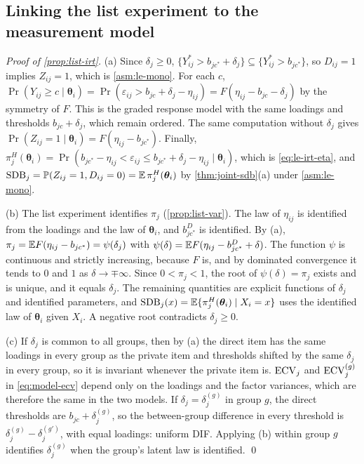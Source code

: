 \subsection{Linking the list experiment to the measurement model}\label{app:pd-irt}

\emph{Proof of \cref{prop:list-irt}.} (a) Since $\delta_j\ge0$, $\{Y^*_{ij}>b_{jc^*}+\delta_j\}\subseteq\{Y^*_{ij}>b_{jc^*}\}$, so $D_{ij}=1$ implies $Z_{ij}=1$, which is \cref{asm:le-mono}. For each $c$, $\Pr(Y_{ij}\ge c\mid\bm\theta_i)=\Pr(\varepsilon_{ij}>b_{jc}+\delta_j-\eta_{ij})=F(\eta_{ij}-b_{jc}-\delta_j)$ by the symmetry of $F$. This is the graded response model with the same loadings and thresholds $b_{jc}+\delta_j$, which remain ordered. The same computation without $\delta_j$ gives $\Pr(Z_{ij}=1\mid\bm\theta_i)=F(\eta_{ij}-b_{jc^*})$. Finally, $\pi^H_j(\bm\theta_i)=\Pr(b_{jc^*}-\eta_{ij}<\varepsilon_{ij}\le b_{jc^*}+\delta_j-\eta_{ij}\mid\bm\theta_i)$, which is \eqref{eq:le-irt-eta}, and $\mathrm{SDB}_j=\mathbb{P}(Z_{ij}=1,D_{ij}=0)=\mathbb{E}\,\pi^H_j(\bm\theta_i)$ by \cref{thm:joint-sdb}(a) under \cref{asm:le-mono}.

(b) The list experiment identifies $\pi_j$ (\cref{prop:list-var}). The law of $\eta_{ij}$ is identified from the loadings and the law of $\bm\theta_i$, and $b^D_{jc^*}$ is identified. By (a), $\pi_j=\mathbb{E} F(\eta_{ij}-b_{jc^*})=\psi(\delta_j)$ with $\psi(\delta)=\mathbb{E} F(\eta_{ij}-b^D_{jc^*}+\delta)$. The function $\psi$ is continuous and strictly increasing, because $F$ is, and by dominated convergence it tends to $0$ and $1$ as $\delta\to\mp\infty$. Since $0<\pi_j<1$, the root of $\psi(\delta)=\pi_j$ exists and is unique, and it equals $\delta_j$. The remaining quantities are explicit functions of $\delta_j$ and identified parameters, and $\mathrm{SDB}_j(x)=\mathbb{E}\{\pi^H_j(\bm\theta_i)\mid X_i=x\}$ uses the identified law of $\bm\theta_i$ given $X_i$. A negative root contradicts $\delta_j\ge0$.

(c) If $\delta_j$ is common to all groups, then by (a) the direct item has the same loadings in every group as the private item and thresholds shifted by the same $\delta_j$ in every group, so it is invariant whenever the private item is. $\mathrm{ECV}_j$ and $\mathrm{ECV}^{(g)}_j$ in \eqref{eq:model-ecv} depend only on the loadings and the factor variances, which are therefore the same in the two models. If $\delta_j=\delta_j^{(g)}$ in group $g$, the direct thresholds are $b_{jc}+\delta_j^{(g)}$, so the between-group difference in every threshold is $\delta_j^{(g)}-\delta_j^{(g')}$, with equal loadings: uniform DIF. Applying (b) within group $g$ identifies $\delta_j^{(g)}$ when the group's latent law is identified.
\qed

